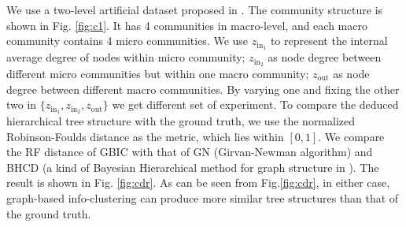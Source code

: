 We use a two-level artificial dataset proposed in \cite{RN22}. 
The community structure is shown in Fig. \ref{fig:c1}. It has 4 communities in macro-level, and each macro community contains 4 micro communities. We use $z_{\mathrm{in}_1}$ to represent the internal average degree of nodes within micro community; $z_{\mathrm{in}_2}$ as node degree between different micro communities but within one macro community; $z_{\mathrm{out}}$ as node degree between different macro communities. By varying one and fixing the other two in $\{z_{\mathrm{in}_1}, z_{\mathrm{in}_2}, z_{\mathrm{out}} \}$ we get different set of experiment. To compare the deduced hierarchical tree structure with the ground truth, we use the normalized Robinson-Foulds distance as the metric, which lies within $[0,1]$. We compare the RF distance of GBIC with that of GN (Girvan-Newman algorithm) and BHCD (a kind of Bayesian Hierarchical method for graph structure in \cite{RN23}). The result is shown in Fig. \ref{fig:cdr}. As can be seen from Fig.\ref{fig:cdr}, in either case, graph-based info-clustering can produce more similar tree structures than that of the ground truth.
